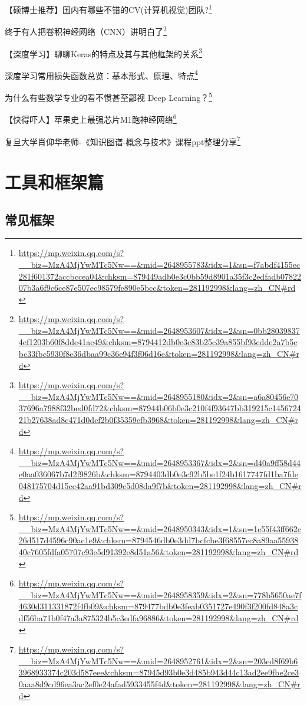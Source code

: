 \documentclass[]{ctexbook}
\renewcommand{\href}[2]{#2\footnote{\url{#1}}}
\begin{document}
\href{https://mp.weixin.qq.com/s?__biz=MzA4MjYwMTc5Nw==\&mid=2648955783\&idx=1\&sn=f7abdf4155ec281f601372accbccea04\&chksm=879449adb0e3c0bb59d8901a35f3c2edfadb0782207b3a6f9c6ce87e507ec98579fe890e5bcc\&token=281192998\&lang=zh_CN\#rd}{【硕博士推荐】国内有哪些不错的CV(计算机视觉)团队?}

\href{https://mp.weixin.qq.com/s?__biz=MzA4MjYwMTc5Nw==\&mid=2648953607\&idx=2\&sn=0bb280398374ef1203b60f8dde41ac49\&chksm=8794412db0e3c83b25c39a855bf93cdde2a7b5cbc33fbc5930f8e36dbaa99c36e94f3f06d16e\&token=281192998\&lang=zh_CN\#rd}{终于有人把卷积神经网络（CNN）讲明白了}

\href{https://mp.weixin.qq.com/s?__biz=MzA4MjYwMTc5Nw==\&mid=2648955180\&idx=2\&sn=a6a80456e7037696a7988f32bed0fd72\&chksm=87944b06b0e3c210f4f93647bb319215c145672421b27638ad8c471d0def2b0f35359cfb3968\&token=281192998\&lang=zh_CN\#rd}{【深度学习】聊聊Keras的特点及其与其他框架的关系}

\href{https://mp.weixin.qq.com/s?__biz=MzA4MjYwMTc5Nw==\&mid=2648953367\&idx=2\&sn=d40a9ff58d44e0aa036067b7d2f9826b\&chksm=8794403db0e3c92b5be1f24b1617747fd1ba7fde048175704d15ee42aa91bd309c5d08da9f7b\&token=281192998\&lang=zh_CN\#rd}{深度学习常用损失函数总览：基本形式、原理、特点}

\href{https://mp.weixin.qq.com/s?__biz=MzA4MjYwMTc5Nw==\&mid=2648950343\&idx=1\&sn=1e55f43ff662c26d517d4596c90ac1e9\&chksm=8794546db0e3dd7bcfcbe3f68557ec8a89aa5593840c7605fdfa05707c93e5d91392e8d51a56\&token=281192998\&lang=zh_CN\#rd}{为什么有些数学专业的看不惯甚至鄙视 Deep Learning？}

\href{https://mp.weixin.qq.com/s?__biz=MzA4MjYwMTc5Nw==\&mid=2648958359\&idx=2\&sn=778b5650ae7f4630d311331872f4fb09\&chksm=879477bdb0e3feab0351727e490f3f200fd848a3cdf56ba71b0f47a3a875324b5c3edfa96886\&token=281192998\&lang=zh_CN\#rd}{【快得吓人】苹果史上最强芯片M1跑神经网络}

\href{https://mp.weixin.qq.com/s?__biz=MzA4MjYwMTc5Nw==\&mid=2648952761\&idx=2\&sn=203ed8f69b63968933374c203d587eee\&chksm=87945d93b0e3d485b943d44c13ad2ee9fbe2ce30aaa8d9cd96ea3ac2ef0e24afad5933455f4d\&token=281192998\&lang=zh_CN\#rd}{复旦大学肖仰华老师-《知识图谱-概念与技术》课程ppt整理分享}

\hypertarget{ux5de5ux5177ux548cux6846ux67b6ux7bc7}{%
\chapter{工具和框架篇}\label{ux5de5ux5177ux548cux6846ux67b6ux7bc7}}

\hypertarget{ux5e38ux89c1ux6846ux67b6}{%
\section{常见框架}\label{ux5e38ux89c1ux6846ux67b6}}
\end{document}

